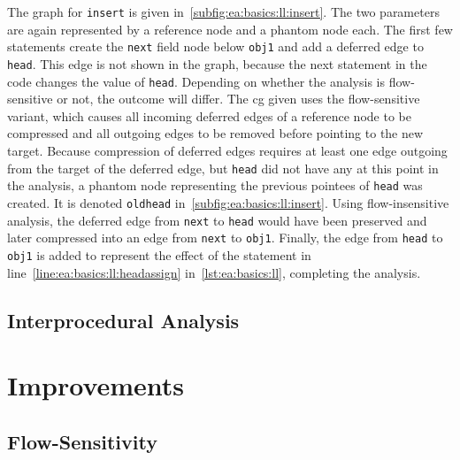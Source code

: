 			The graph for \texttt{insert} is given in~\cref{subfig:ea:basics:ll:insert}. The two parameters are again
			represented by a reference node and a phantom node each. The first few statements create the \texttt{next} field
			node below \texttt{obj1} and add a deferred edge to \texttt{head}. This edge is not shown in the graph, because
			the next statement in the code changes the value of \texttt{head}. Depending on whether the analysis is
			flow-sensitive or not, the outcome will differ. The \gls{cg} given uses the flow-sensitive variant, which causes
			all incoming deferred edges of a reference node to be compressed and all outgoing edges to be removed before
			pointing to the new target. Because compression of deferred edges requires at least one edge outgoing from the
			target of the deferred edge, but \texttt{head} did not have any at this point in the analysis, a phantom node
			representing the previous pointees of \texttt{head} was created. It is denoted \texttt{oldhead}
			in~\cref{subfig:ea:basics:ll:insert}. Using flow-insensitive analysis, the deferred edge from \texttt{next} to
			\texttt{head} would have been preserved and later compressed into an edge from \texttt{next} to \texttt{obj1}.
			Finally, the edge from \texttt{head} to \texttt{obj1} is added to represent the effect of the statement in
			line~\ref{line:ea:basics:ll:headassign} in~\cref{lst:ea:basics:ll}, completing the analysis.

			\subsection{Interprocedural Analysis}
				\label{sub:ea:basics:global}


	\section{Improvements}
		\label{sec:ea:improvements}

		\subsection{Flow-Sensitivity}
			\label{subsec:ea:improvements:flow-sensitivity}

